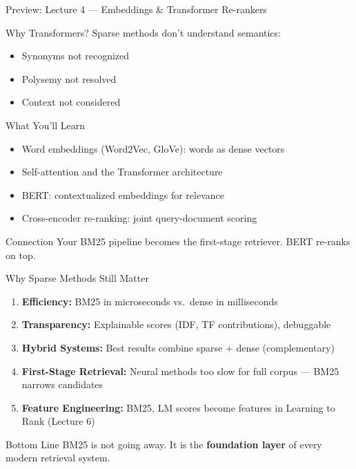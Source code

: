 \documentclass[aspectratio=169]{beamer}
\begin{document}
\begin{frame}{Preview: Lecture 4 --- Embeddings \& Transformer Re-rankers}
\begin{block}{Why Transformers?}
Sparse methods don't understand semantics:
\begin{itemize}
    \item Synonyms not recognized
    \item Polysemy not resolved
    \item Context not considered
\end{itemize}
\end{block}

\begin{block}{What You'll Learn}
\begin{itemize}
    \item Word embeddings (Word2Vec, GloVe): words as dense vectors
    \item Self-attention and the Transformer architecture
    \item BERT: contextualized embeddings for relevance
    \item Cross-encoder re-ranking: joint query-document scoring
\end{itemize}
\end{block}

\begin{exampleblock}{Connection}
Your BM25 pipeline becomes the first-stage retriever. BERT re-ranks on top.
\end{exampleblock}
\end{frame}

\begin{frame}{Why Sparse Methods Still Matter}
\begin{enumerate}
    \item \textbf{Efficiency:} BM25 in microseconds vs.\ dense in milliseconds
    
    \item \textbf{Transparency:} Explainable scores (IDF, TF contributions), debuggable
    
    \item \textbf{Hybrid Systems:} Best results combine sparse + dense (complementary)
    
    \item \textbf{First-Stage Retrieval:} Neural methods too slow for full corpus --- BM25 narrows candidates
    
    \item \textbf{Feature Engineering:} BM25, LM scores become features in Learning to Rank (Lecture 6)
\end{enumerate}

\vspace{1em}

\begin{alertblock}{Bottom Line}
BM25 is not going away. It is the \textbf{foundation layer} of every modern retrieval system.
\end{alertblock}
\end{frame}
\end{document}
